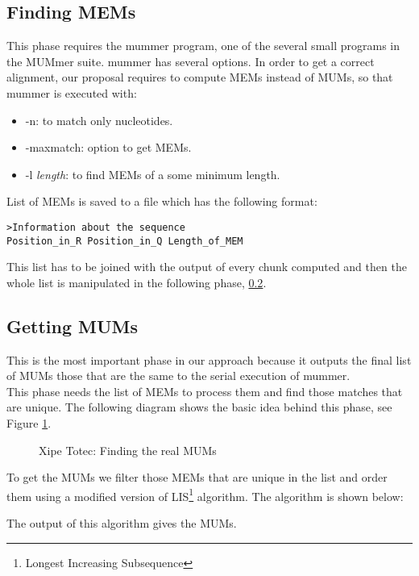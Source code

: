 \documentclass[twocolumn,twoside]{Jornadas}
\begin{document}
\subsection{Finding MEMs}
This phase requires the mummer program, one of the several small programs in the MUMmer suite. mummer has several options.
In order to get a correct alignment, our proposal requires to compute MEMs instead of MUMs, so that mummer is executed with:
\begin{itemize}
  \item -n: to match only nucleotides.
  \item -maxmatch: option to get MEMs.
  \item -l \emph{length}: to find MEMs of a some minimum length.
\end{itemize}
List of MEMs is saved to a file which has the following format:
\begin{verbatim}
>Information about the sequence
Position_in_R Position_in_Q Length_of_MEM
\end{verbatim}
This list has to be joined with the output of every chunk computed and then the whole list is  manipulated in the following phase, \ref{getting}.
\subsection{Getting MUMs}
\label{getting}
This is the most important phase in our approach because it outputs the final list of MUMs those that are the same to the serial execution of mummer.\\
This phase needs the list of MEMs to process them and find those matches that are unique. The following diagram shows the basic idea behind this phase, see Figure \ref{xt}.
\begin{figure}[htb]  
 \begin{center} 
 \end{center} 
 \caption{Xipe Totec: Finding the real MUMs} 
   \label{xt} 
\end{figure}
To get the MUMs we filter those MEMs that are unique in the list and order them using a modified version of LIS\footnote{Longest Increasing Subsequence} algorithm.
The algorithm is shown below:
\begin{algorithmic}
\ELSE {}
\ENDIF
\ENDFOR
{}
\ELSE {}
\ENDIF
\ENDFOR
\end{algorithmic}
The output of this algorithm gives the MUMs.
\end{document}
